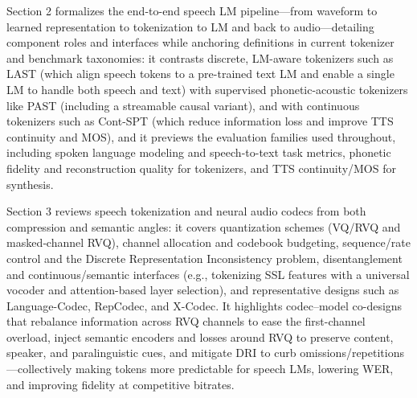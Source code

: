 \documentclass{article}
\begin{document}
Section 2 formalizes the end-to-end speech LM pipeline—from waveform to learned representation to tokenization to LM and back to audio—detailing component roles and interfaces while anchoring definitions in current tokenizer and benchmark taxonomies: it contrasts discrete, LM-aware tokenizers such as LAST (which align speech tokens to a pre-trained text LM and enable a single LM to handle both speech and text) with supervised phonetic-acoustic tokenizers like PAST (including a streamable causal variant), and with continuous tokenizers such as Cont-SPT (which reduce information loss and improve TTS continuity and MOS), and it previews the evaluation families used throughout, including spoken language modeling and speech-to-text task metrics, phonetic fidelity and reconstruction quality for tokenizers, and TTS continuity/MOS for synthesis. \cite{li2025continuousspeechtokenizertext,har-tuv2025pastphoneticacousticspeechtokenizer,turetzky2024lastlanguagemodelawarespeechtokenization} 



Section 3 reviews speech tokenization and neural audio codecs from both compression and semantic angles: it covers quantization schemes (VQ/RVQ and masked‑channel RVQ), channel allocation and codebook budgeting, sequence/rate control and the Discrete Representation Inconsistency problem, disentanglement and continuous/semantic interfaces (e.g., tokenizing SSL features with a universal vocoder and attention-based layer selection), and representative designs such as Language-Codec, RepCodec, and X-Codec. It highlights codec–model co-designs that rebalance information across RVQ channels to ease the first-channel overload, inject semantic encoders and losses around RVQ to preserve content, speaker, and paralinguistic cues, and mitigate DRI to curb omissions/repetitions—collectively making tokens more predictable for speech LMs, lowering WER, and improving fidelity at competitive bitrates. \cite{liu2024analyzingmitigatinginconsistencydiscrete,ye2024codecdoesmatterexploringsemanticshortcom,ji2025languagecodecbridgingdiscreterepresentat,huang2024repcodecspeechrepresentationcodectokeniz,mousavi2024howshouldweextractdiscreteaudiotokenssel} 
\end{document}
